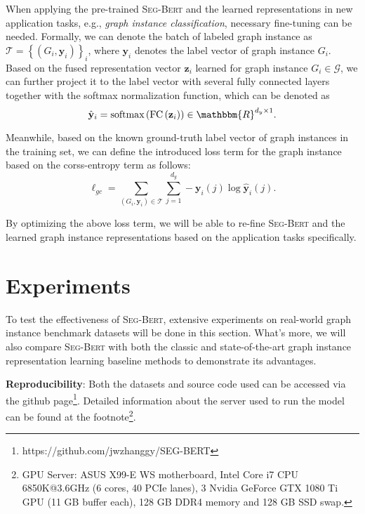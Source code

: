 \documentclass{article}
\newcommand{\mb}{\mathbf}
\newcommand{\mc}{\mathcal}
\newcommand{\our}{\textsc{Seg-Bert}}
\begin{document}
When applying the pre-trained {\our} and the learned representations in new application tasks, e.g., \textit{graph instance classification}, necessary fine-tuning can be needed. Formally, we can denote the batch of labeled graph instance as $\mc{T} = \left\{ (G_i, \mb{y}_i) \right\}_{i}$, where $\mb{y}_i$ denotes the label vector of graph instance $G_i$. Based on the fused representation vector $\mb{z}_i$ learned for graph instance $G_i \in \mc{G}$, we can further project it to the label vector with several fully connected layers together with the softmax normalization function, which can be denoted as
\begin{equation}
\hat{\mb{y}}_i = \mbox{softmax} \left( \mbox{FC} \left( \mb{z}_i \right) \right) \in \mathbbm{R}^{d_y \times 1}.
\end{equation}

Meanwhile, based on the known ground-truth label vector of graph instances in the training set, we can define the introduced loss term for the graph instance based on the corss-entropy term as follows:
\begin{equation}
\ell_{gc} = \sum_{(G_i, \mb{y}_i) \in \mc{T}} \sum_{j=1}^{d_y} - \mb{y}_i(j) \log \hat{\mb{y}}_i(j).
\end{equation}



By optimizing the above loss term, we will be able to re-fine {\our} and the learned graph instance representations based on the application tasks specifically.










\section{Experiments}\label{sec:experiment}

To test the effectiveness of {\our}, extensive experiments on real-world graph instance benchmark datasets will be done in this section. What's more, we will also compare {\our} with both the classic and state-of-the-art graph instance representation learning baseline methods to demonstrate its advantages. 

\noindent \textbf{Reproducibility}: Both the datasets and source code used can be accessed via the github page\footnote{https://github.com/jwzhanggy/SEG-BERT}. Detailed information about the server used to run the model can be found at the footnote\footnote{GPU Server: ASUS X99-E WS motherboard, Intel Core i7 CPU 6850K@3.6GHz (6 cores, 40 PCIe lanes), 3 Nvidia GeForce GTX 1080 Ti GPU (11 GB buffer each), 128 GB DDR4 memory and 128 GB SSD swap.}.
\end{document}
